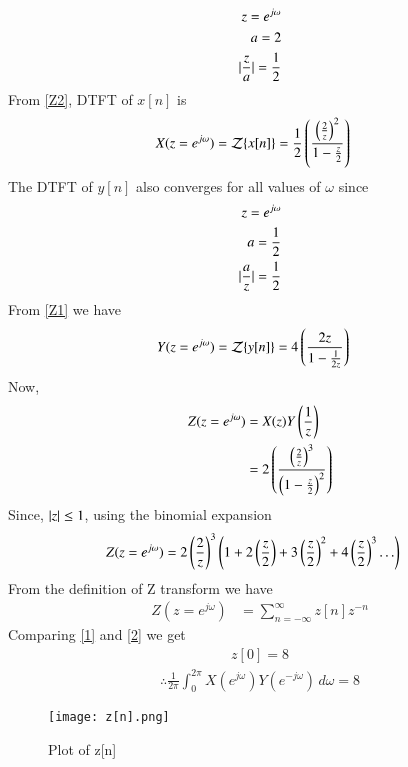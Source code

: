 \documentclass[journal,12pt,twocolumn]{IEEEtran}
\begin{document}
\begin{align}
    z=e^{j\omega}\\
    a=2\\
    \vert\frac{z}{a}\vert=\frac{1}{2}
\end{align}
From \eqref {Z2}, DTFT of $x[n]$ is
\begin{align}
    X(z=e^{j\omega})&={\mathcal {Z}}\{x[n]\}
    =\frac{1}{2}\left(\frac{\left(\frac{2}{z}\right)^2}{1-\frac{z}{2}}\right)
\end{align}
The DTFT of $y[n]$ also converges for all values of $\omega$ since 
\begin{align}
    z=e^{j\omega}\\
    a=\frac{1}{2}\\
    \vert\frac{a}{z}\vert=\frac{1}{2}
\end{align}
From \eqref{Z1} we have
\begin{align}
    Y(z=e^{j\omega})&={\mathcal {Z}}\{y[n]\}=4\left(\frac{2z}{1-\frac{1}{2z}}\right)
\end{align}
Now,
\begin{align}
  Z(z=e^{j\omega})&= X(z) Y\left(\frac{1}{z}\right) \\
  &=2\left(\frac {\left(\frac{2}{z}\right)^3} {\left(1-\frac{z}{2}\right)^2}\right)
\end{align}
Since, $\vert z\vert\leq 1$, using the binomial expansion
\begin{align}
  Z(z=e^{j\omega})&=2 \left(\frac{2}{z}\right)^3\left(1+2\left(\frac{z}{2}\right)+3\left(\frac{z}{2}\right)^2+4\left(\frac{z}{2}\right)^3 \ldots\right)\label{1}
\end{align}
From the definition of Z transform we have
\begin{align}
 Z(z=e^{j\omega})&=  \sum _{n=-\infty }^{\infty }z[n]z^{-n}\label{2}
\end{align}
Comparing \eqref{1} and \eqref{2} we get
\begin{align}
    z[0]=8
\end{align}
\begin{align}
    \therefore \frac{1}{2\pi} \int_{0}^{2\pi} X(e^{j\omega}) Y(e^{-j\omega}) \, d\omega =8
\end{align}
\begin{figure}[!h]
         \centering
         \texttt{[image: z[n].png]}
         \caption{Plot of z[n]}
         \label{plot}
\end{figure}
\end{document}
